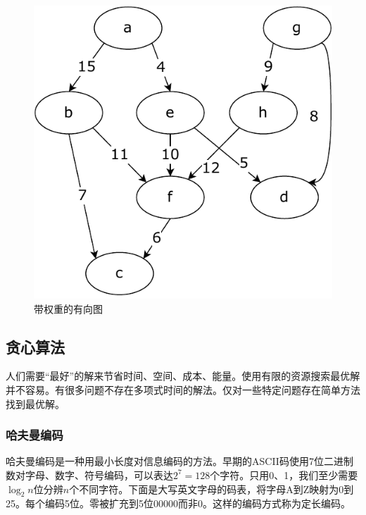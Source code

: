 \documentclass[b5paper]{ctexart}
\begin{document}
\begin{figure}[htbp]
 \centering
 \includegraphics[scale=0.5]{img/weighted-dag}
 \caption{带权重的有向图}
 \label{fig:weighted-dag}
\end{figure}

\subsection{贪心算法}

人们需要“最好”的解来节省时间、空间、成本、能量。使用有限的资源搜索最优解并不容易。有很多问题不存在多项式时间的解法。仅对一些特定问题存在简单方法找到最优解。

\subsubsection{哈夫曼编码} 
哈夫曼编码是一种用最小长度对信息编码的方法。早期的ASCII码使用7位二进制数对字母、数字、符号编码，可以表达$2^7 = 128$个字符。只用0、1，我们至少需要$\log_2 n$位分辨$n$个不同字符。下面是大写英文字母的码表，将字母A到Z映射为0到25。每个编码5位。零被扩充到5位00000而非0。这样的编码方式称为定长编码。
\end{document}
